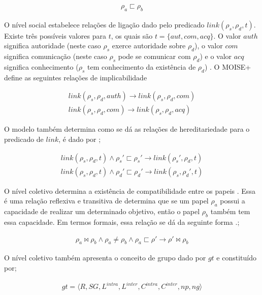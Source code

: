 \begin{eqnarray}\nonumber
\rho_a \sqsubset \rho_b
\end{eqnarray}

O nível social estabelece relações de ligação dado pelo predicado $link(\rho_s,\rho_d,t)$. Existe três possíveis valores para $t$, os quais são $t = \{aut, com, acq\}$. O valor $auth$ significa 
autoridade (neste caso $\rho_s$ exerce autoridade sobre $\rho_d$), o valor $com$ significa comunicação (neste caso $\rho_s$ pode se comunicar com $\rho_d$) e o valor $acq$ significa conhecimento 
($\rho_s$ tem conhecimento da existência de $\rho_d$) \cite{moiseframework} \cite{moiseframeworktwo} \cite{dynamicagenttemporalstruct}. O MOISE+ define as seguintes relações de implicabilidade

\begin{eqnarray}\nonumber
	link(\rho_s,\rho_d,auth) \to link(\rho_s,\rho_d,com) \nonumber \\
	link(\rho_s,\rho_d,com) \to link(\rho_s,\rho_d,acq) 
\end{eqnarray}

O modelo também determina como se dá as relações de hereditariedade para o predicado de $link$, é dado por \cite{moiseframework} \cite{dynamicagenttemporalstruct}; 

\begin{eqnarray}\nonumber
	link(\rho_s,\rho_d,t) \wedge \rho_s' \sqsubset \rho_s' \to link(\rho_s',\rho_d,t) \nonumber \\
	link(\rho_s,\rho_d,t) \wedge \rho_d' \sqsubset \rho_d' \to link(\rho_s,\rho_d',t) 	
\end{eqnarray}


O nível coletivo determina a existência de compatibilidade entre os papeis \cite{moiseframework}. Essa é uma relação reflexiva e transitiva de determina que se um papel $\rho_a$ possui a 
capacidade de realizar um determinado objetivo, então o papel $\rho_b$ também tem essa capacidade. Em termos formais, essa relação se dá da seguinte forma \cite{moiseframework} \cite{deonticOne}.;

\begin{eqnarray}\nonumber
	\rho_a \bowtie \rho_b \wedge \rho_a \neq \rho_b \wedge \rho_a \sqsubset \rho' \to \rho' \bowtie \rho_b 
\end{eqnarray}

O nível coletivo também apresenta o conceito de grupo dado por $gt$ e constituído por;

\begin{eqnarray}\nonumber
	gt = \langle R,SG,L^{intra},L^{inter},C^{intra},C^{inter},np,ng\rangle 
\end{eqnarray}

